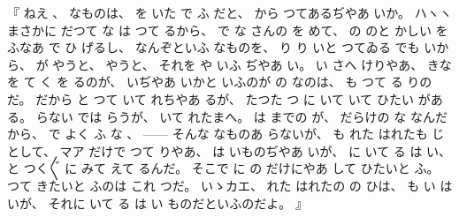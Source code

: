 %
『%
ねえ
、
%
なものは、
%
を
いた
で
ふ
だと、
%
から
つてあるぢやあ
いか。
%
ハヽヽ
まさかに
だつて
な
は
つて
るから、
%
で
な
さんの
を
めて、
%
の
のと
かしい
を
ふなあ
で
ひ
げるし、
%
なんぞといふ
なものを、
%
り
り
いと
つてゐる
でも
いから、
%
%
が
やうと、
%
やうと、
%
それを
や
いふ
ぢやあ
い。
%
い
さへ
けりやあ、
%
きな
を
て
く
を
るのが、
%
いぢやあ
いかと
いふのが
の
なのは、
%
も
つて
る
りの
だ。
%
だから
と
つて
いて
れちやあ
るが、
%
たつた
つ
に
いて
いて
ひたい
がある。
%
らない
では
らうが、
%
いて
れたまへ。
%
は
までの
が、
%
だらけの
な
なんだから、
%
で
よく
ふ
な
、
{---}{---}
そんな
なものあ
らないが、
%
も
れた
はれたも
じ
として、
%
マア
だけで
つて
りやあ、
%
は
いものぢやあ
いが、
%
に
いて
る
は
い、
%
と
つく〴〵
に
みて
えて
るんだ。
%
そこで
に
の
だけにやあ
して
ひたいと
ふ。
%
%
つて
きたいと
ふのは
これ
つだ。
%
いゝカエ、
%
れた
はれたの
の
ひは、
%
も
い
は
いが、
%
それに
いて
る
は
い
ものだといふのだよ。
』%

